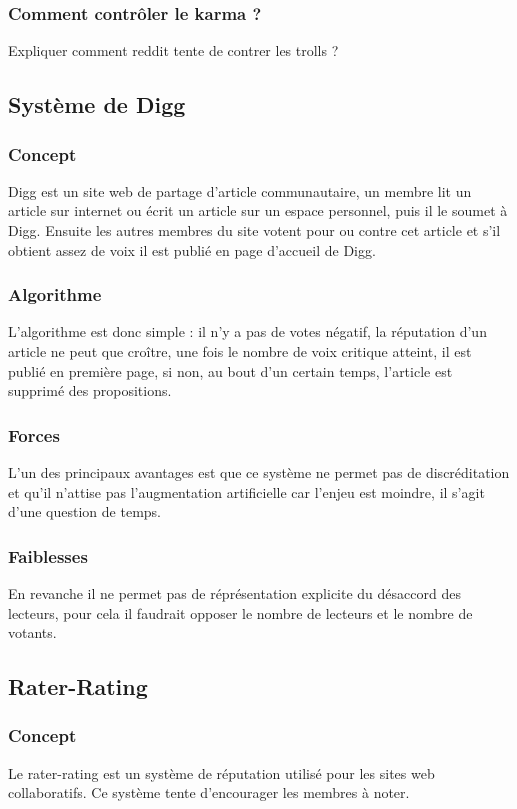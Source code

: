 \documentclass[a4paper, 11pt]{article} %
\begin{document}
\subsubsection{Comment contrôler le karma ?}
Expliquer comment reddit tente de contrer les trolls ?


\subsection{Système de Digg}
\subsubsection{Concept}
Digg est un site web de partage d'article communautaire, un membre lit un article sur internet ou écrit un article sur un espace personnel, puis il le soumet à Digg.
Ensuite les autres membres du site votent pour ou contre cet article et s'il obtient assez de voix il est publié en page d'accueil de Digg.

\subsubsection{Algorithme}
L'algorithme est donc simple : il n'y a pas de votes négatif, la réputation d'un article ne peut que croître, une fois le nombre de voix critique atteint, il est publié en première page, si non, au bout d'un certain temps, l'article est supprimé des propositions.

\subsubsection{Forces}
L'un des principaux avantages est que ce système ne permet pas de discréditation et qu'il n'attise pas l'augmentation artificielle car l'enjeu est moindre, il s'agit d'une question de temps.

\subsubsection{Faiblesses}
En revanche il ne permet pas de réprésentation explicite du désaccord des lecteurs, pour cela il faudrait opposer le nombre de lecteurs et le nombre de votants.

\subsection{Rater-Rating}
\subsubsection{Concept}
Le rater-rating est un système de réputation utilisé pour les sites web collaboratifs. Ce système tente d'encourager les membres à noter.
\end{document}
